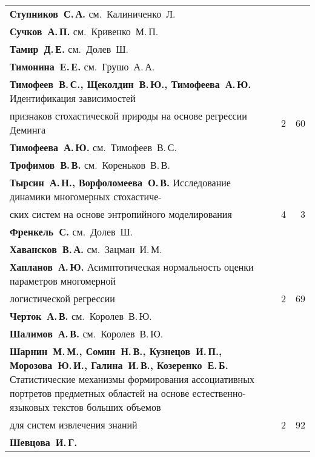 {\begin{tabular}{p{388pt}rr}
\textbf{Ступников~С.\,А.} см.~Калиниченко~Л.&&\\
\textbf{Сучков~А.\,П.} см.~Кривенко~М.\,П.&&\\
\textbf{Тамир~Д.\,Е.} см.~Долев~Ш.&&\\
\textbf{Тимонина~Е.\,Е.} см.~Грушо~А.\,А.&&\\
\textbf{Тимофеев~В.\,С., Щеколдин~В.\,Ю., Тимофеева~А.\,Ю.}
Идентификация зависимостей\linebreak
\vspace*{-12pt}\\
\hspace*{23pt}признаков стохастической природы на основе регрессии
Деминга\dotfill&2&60\\
\textbf{Тимофеева~А.\,Ю.} см.~Тимофеев~В.\,С.&&\\
\textbf{Трофимов~В.\,В.} см.~Кореньков~В.\,В.&&\\
\textbf{Тырсин~А.\,Н., Ворфоломеева~О.\,В.}
Исследование динамики многомерных стохастиче-\linebreak
\vspace*{-12pt}\\
\hspace*{23pt}ских систем на основе энтропийного моделирования\dotfill&4&3\\
\textbf{Френкель~С.} см.~Долев~Ш.&&\\
\textbf{Хавансков~В.\,А.} см.~Зацман~И.\,М.&&\\
\textbf{Хапланов~А.\,Ю.}
Асимптотическая нормальность оценки параметров многомерной\linebreak
\vspace*{-12pt}\\
\hspace*{23pt}логистической регрессии\dotfill&2&69\\
\textbf{Черток~А.\,В.} см.~Королев~В.\,Ю.&&\\
\textbf{Шалимов~А.\,В.} см.~Королев~В.\,Ю.&&\\
\hangindent=23pt\noindent\textbf{Шарнин~М.\,М., Сомин~Н.\,В., Кузнецов~И.\,П., Морозова~Ю.\,И.,
Галина~И.\,В., Козеренко~Е.\,Б.}
Статистические механизмы формирования ассоциативных портретов предметных
областей на основе естественно-языковых текстов больших объемов\linebreak
\vspace*{-12pt}\\
\hspace*{23pt}для систем извлечения знаний\dotfill&2&92\\
\textbf{Шевцова~И.\,Г.}

\end{tabular}}
